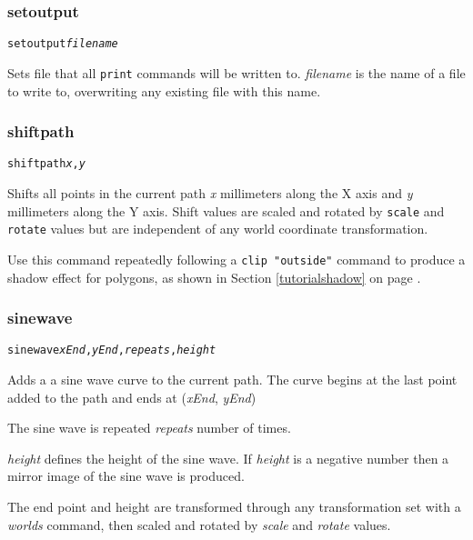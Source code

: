 \subsubsection{setoutput}

\begin{alltt}
setoutput \textit{filename}
\end{alltt}

Sets file that all \texttt{print} commands will be written to.
\textit{filename} is the name of a file to write to, overwriting any
existing file with this name.

\subsubsection{shiftpath}

\begin{alltt}
shiftpath \textit{x}, \textit{y}
\end{alltt}

Shifts all points in the current path \textit{x} millimeters along the X axis
and \textit{y} millimeters along the Y axis.  Shift values are scaled and
rotated by \texttt{scale} and \texttt{rotate} values but are independent
of any world coordinate transformation.

Use this command
repeatedly following a \texttt{clip "outside"} command to produce a shadow
effect for polygons, as shown in 
Section \ref{tutorialshadow} on page \pageref{tutorialshadow}.

\subsubsection{sinewave}

\begin{alltt}
sinewave \textit{xEnd}, \textit{yEnd}, \textit{repeats}, \textit{height}
\end{alltt}

Adds a a sine wave curve to the current path.  The curve begins at
the last point added to the path and ends at (\textit{xEnd}, \textit{yEnd})

The sine wave is repeated \textit{repeats} number of times.

\textit{height} defines the height of the sine wave.
If \textit{height} is a negative number then a mirror image
of the sine wave is produced.

The end point and height are transformed through any
transformation set with a \textit{worlds} command,
then scaled and rotated by \textit{scale}
and \textit{rotate} values.

